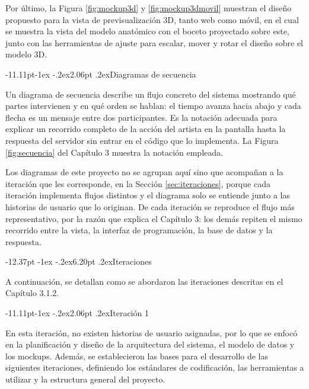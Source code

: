 \documentclass[12pt,letterpaper,oneside]{report}
\makeatletter
\renewcommand\section{\@startsection{section}{1}{\z@}%
  {-12.37pt \@plus -1ex \@minus -.2ex}{6.20pt \@plus.2ex}{\normalfont\large\bfseries}}
\renewcommand\subsection{\@startsection{subsection}{2}{\z@}%
  {-11.11pt\@plus -1ex \@minus -.2ex}{2.06pt \@plus .2ex}{\normalfont\normalsize\bfseries}}
\makeatother
\begin{document}
Por último, la Figura \ref{fig:mockup3d} y \ref{fig:mockup3dmovil} muestran el diseño propuesto para la vista de previsualización 3D, tanto web como móvil, en el cual se muestra la vista del modelo anatómico con el boceto proyectado sobre este, junto con las herramientas de ajuste para escalar, mover y rotar el diseño sobre el modelo 3D.

\subsection{Diagramas de secuencia}

Un diagrama de secuencia describe un flujo concreto del sistema mostrando qué partes intervienen y en qué orden se hablan: el tiempo avanza hacia abajo y cada flecha es un mensaje entre dos participantes. Es la notación adecuada para explicar un recorrido completo de la acción del artista en la pantalla hasta la respuesta del servidor sin entrar en el código que lo implementa. La Figura \ref{fig:secuencia} del Capítulo 3 muestra la notación empleada.

Los diagramas de este proyecto no se agrupan aquí sino que acompañan a la iteración que les corresponde, en la Sección \ref{sec:iteraciones}, porque cada iteración implementa flujos distintos y el diagrama solo se entiende junto a las historias de usuario que lo originan. De cada iteración se reproduce el flujo más representativo, por la razón que explica el Capítulo 3: los demás repiten el mismo recorrido entre la vista, la interfaz de programación, la base de datos y la respuesta.

\section{Iteraciones}
\label{sec:iteraciones}

A continuación, se detallan como se abordaron las iteraciones descritas en el Capítulo 3.1.2.

\subsection{Iteración 1}

En esta iteración, no existen historias de usuario asignadas, por lo que se enfocó en la planificación y diseño de la arquitectura del sistema, el modelo de datos y los mockups. Además, se establecieron las bases para el desarrollo de las siguientes iteraciones, definiendo los estándares de codificación, las herramientas a utilizar y la estructura general del proyecto.
\end{document}
